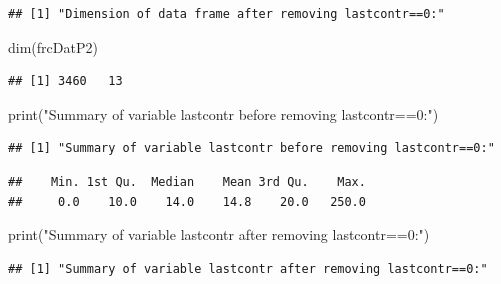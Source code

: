\documentclass[
]{article}
\newenvironment{Shaded}{\begin{snugshade}}{\end{snugshade}}
\newcommand{\FunctionTok}[1]{\textcolor[rgb]{0.00,0.00,0.00}{#1}}
\newcommand{\NormalTok}[1]{#1}
\newcommand{\SpecialCharTok}[1]{\textcolor[rgb]{0.00,0.00,0.00}{#1}}
\newcommand{\StringTok}[1]{\textcolor[rgb]{0.31,0.60,0.02}{#1}}
\begin{document}
\begin{verbatim}
## [1] "Dimension of data frame after removing lastcontr==0:"
\end{verbatim}

\begin{Shaded}
\begin{Highlighting}[]
\FunctionTok{dim}\NormalTok{(frcDatP2)}
\end{Highlighting}
\end{Shaded}

\begin{verbatim}
## [1] 3460   13
\end{verbatim}

\begin{Shaded}
\begin{Highlighting}[]
\FunctionTok{print}\NormalTok{(}\StringTok{"Summary of variable lastcontr before removing lastcontr==0:"}\NormalTok{)}
\end{Highlighting}
\end{Shaded}

\begin{verbatim}
## [1] "Summary of variable lastcontr before removing lastcontr==0:"
\end{verbatim}

\begin{Shaded}
\end{Shaded}

\begin{verbatim}
##    Min. 1st Qu.  Median    Mean 3rd Qu.    Max. 
##     0.0    10.0    14.0    14.8    20.0   250.0
\end{verbatim}

\begin{Shaded}
\begin{Highlighting}[]
\FunctionTok{print}\NormalTok{(}\StringTok{"Summary of variable lastcontr after removing lastcontr==0:"}\NormalTok{)}
\end{Highlighting}
\end{Shaded}

\begin{verbatim}
## [1] "Summary of variable lastcontr after removing lastcontr==0:"
\end{verbatim}

\begin{Shaded}
\end{Shaded}
\end{document}
